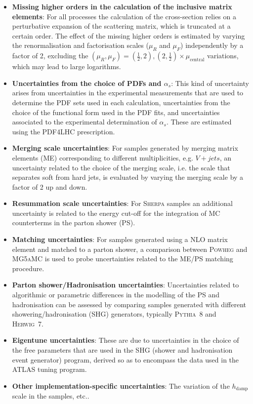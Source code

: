 \begin{itemize}
    \item \textbf{Missing higher orders in the calculation of the inclusive matrix elements}: For all processes the calculation of the cross-section relies on a perturbative expansion of the scattering matrix, which is truncated at a certain order. The effect of the missing higher orders is estimated by varying the renormalisation and factorisation scales ($\mu_R$ and $\mu_F$) independently by a factor of 2, excluding the $(\mu_R,\mu_F)=(\frac{1}{2},2),(2,\frac{1}{2})\times \mu_{\text{central}}$ variations, which may lead to large logarithms. 
    \item \textbf{Uncertainties from the choice of PDFs and $\alpha_s$}: This kind of uncertainty arises from uncertainties in the experimental measurements that are used to determine the PDF sets used in each calculation, uncertainties from the choice of the functional form used in the PDF fits, and uncertainties associated to the experimental determination of $\alpha_s$. These are estimated using the PDF4LHC prescription\cite{Butterworth_2016}.
    \item \textbf{Merging scale uncertainties}: For samples generated by merging matrix elements (ME) corresponding to different multiplicities, e.g. $V+jets$, an uncertainty related to the choice of the merging scale, i.e. the scale that separates soft from hard jets, is evaluated by varying the merging scale by a factor of 2 up and down.
    \item \textbf{Resummation scale uncertainties}: For \textsc{Sherpa}\cite{Gleisberg_2009} samples an additional uncertainty is related to the energy cut-off for the integration of MC counterterms in the parton shower (PS).
    \item \textbf{Matching uncertainties}: For samples generated using a NLO matrix element and matched to a parton shower, a comparison between \textsc{Powheg} and \textsc{MG5aMC} is used to probe uncertainties related to the ME/PS matching procedure.
    \item \textbf{Parton shower/Hadronisation uncertainties}: Uncertainties related to algorithmic or parametric differences in the modelling of the PS and hadronisation can be assessed by comparing samples generated with different showering/hadronisation (SHG) generators, typically \textsc{Pythia~8} and \textsc{Herwig~7}.  
    \item \textbf{Eigentune uncertainties}: These are due to uncertainties in the choice of the free parameters that are used in the SHG (shower and hadronisation event generator) program, derived so as to encompass the data used in the ATLAS tuning program\cite{ATL-PHYS-PUB-2014-021}.
    \item \textbf{Other implementation-specific uncertainties}: The variation of the $h_{\text{damp}}$ scale in the  samples, etc..
\end{itemize}

